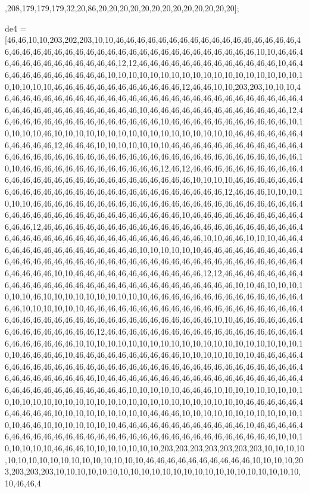 ,208,179,179,179,32,20,86,20,20,20,20,20,20,20,20,20,20,20,20,20];

de4 = [46,46,10,10,203,202,203,10,10,46,46,46,46,46,46,46,46,46,46,46,46,46,46,46,46,46,46,46,46,46,46,46,46,46,46,46,46,46,46,46,46,46,46,46,46,46,46,46,46,46,10,10,46,46,46,46,46,46,46,46,46,46,46,46,46,12,12,46,46,46,46,46,46,46,46,46,46,46,46,46,10,46,46,46,46,46,46,46,46,46,46,46,10,10,10,10,10,10,10,10,10,10,10,10,10,10,10,10,10,10,10,10,10,10,10,46,46,46,46,46,46,46,46,46,46,46,46,12,46,46,10,10,203,203,10,10,10,46,46,46,46,46,46,46,46,46,46,46,46,46,46,46,46,46,46,46,46,46,46,46,46,46,46,46,46,46,46,46,46,46,46,46,46,46,46,46,46,46,10,46,46,46,46,46,46,46,46,46,46,46,46,46,12,46,46,46,46,46,46,46,46,46,46,46,46,46,46,46,10,46,46,46,46,46,46,46,46,46,46,46,10,10,10,10,10,46,10,10,10,10,10,10,10,10,10,10,10,10,10,10,10,10,10,46,46,46,46,46,46,46,46,46,46,46,12,46,46,46,10,10,10,10,10,10,10,46,46,46,46,46,46,46,46,46,46,46,46,46,46,46,46,46,46,46,46,46,46,46,46,46,46,46,46,46,46,46,46,46,46,46,46,46,46,46,46,10,10,46,46,46,46,46,46,46,46,46,46,46,46,46,12,46,12,46,46,46,46,46,46,46,46,46,46,46,46,46,46,46,46,46,46,46,46,46,46,46,46,46,46,46,46,10,10,10,10,46,46,46,46,46,46,46,46,46,46,46,46,46,46,46,46,46,46,46,46,46,46,46,46,46,46,46,12,46,46,46,10,10,10,10,10,10,46,46,46,46,46,46,46,46,46,46,46,46,46,46,46,46,46,46,46,46,46,46,46,46,46,46,46,46,46,46,46,46,46,46,46,46,46,46,46,46,46,46,10,46,46,46,46,46,46,46,46,46,46,46,46,46,12,46,46,46,46,46,46,46,46,46,46,46,46,46,46,46,46,46,46,46,46,46,46,46,46,46,46,46,46,46,46,46,46,46,46,46,46,46,46,46,46,46,46,46,10,10,46,46,10,10,10,46,46,46,46,46,46,46,46,46,46,46,46,46,46,46,10,10,10,10,10,10,46,46,46,46,46,46,46,46,46,46,46,46,46,46,46,46,46,46,46,46,46,46,46,46,46,46,46,46,46,46,46,46,46,46,46,46,46,46,46,46,46,46,10,10,46,46,46,46,46,46,46,46,46,46,46,46,12,12,46,46,46,46,46,46,46,46,46,46,46,46,46,46,46,46,46,46,46,46,46,46,46,46,46,46,46,46,46,10,10,46,10,10,10,10,10,10,46,10,10,10,10,10,10,10,10,10,10,46,46,46,46,46,46,46,46,46,46,46,46,46,46,46,46,10,10,10,10,10,10,46,46,46,46,46,46,46,46,46,46,46,46,46,46,46,46,46,46,46,46,46,46,46,46,46,46,46,46,46,46,46,46,46,46,46,46,46,46,46,46,10,10,46,46,46,46,46,46,46,46,46,46,46,46,46,46,46,12,46,46,46,46,46,46,46,46,46,46,46,46,46,46,46,46,46,46,46,46,46,46,46,46,46,10,10,10,10,10,10,10,10,10,10,10,10,10,10,10,10,10,10,10,10,10,10,10,46,46,46,46,10,46,46,46,46,46,46,46,46,46,46,10,10,10,10,10,10,10,46,46,46,46,46,46,46,46,46,46,46,46,46,46,46,46,46,46,46,46,46,46,46,46,46,46,46,46,46,46,46,46,46,46,46,46,46,46,46,46,46,10,46,46,46,46,46,46,46,46,46,46,46,46,46,46,46,46,46,46,46,46,46,46,46,46,46,46,46,46,46,46,10,10,10,10,10,46,46,46,10,10,10,10,10,10,10,10,10,10,10,10,10,10,10,10,10,10,10,10,10,10,10,10,10,10,10,10,10,10,10,46,46,46,46,46,46,46,46,46,46,10,10,10,10,10,10,10,10,10,46,46,46,10,10,10,10,10,10,10,10,10,10,10,10,10,46,46,10,10,10,10,10,10,10,46,46,46,46,46,46,46,46,46,46,46,46,10,46,46,46,46,46,46,46,46,46,46,46,46,46,46,46,46,46,46,46,46,46,46,46,46,46,46,46,46,46,46,10,10,10,10,10,10,10,46,46,46,10,10,10,10,10,10,10,203,203,203,203,203,203,203,10,10,10,10,10,10,10,10,10,10,10,10,10,10,10,10,10,46,46,46,46,46,46,46,46,46,46,10,10,10,10,203,203,203,203,10,10,10,10,10,10,10,10,10,10,10,10,10,10,10,10,10,10,10,10,10,10,10,10,46,46,4